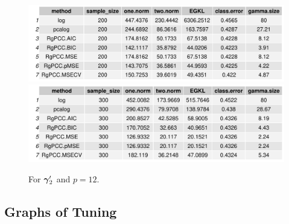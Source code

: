 \documentclass[main.tex]{subfiles}
\begin{document}
\begin{figure}[H]
	\centering
	\includegraphics[width =  \textwidth]{simulated/(sparsity1-100,80)_metrics.pdf}
	\includegraphics[width =  \textwidth]{simulated/(sparsity1-200,80)_metrics.pdf}
	\caption{For $\boldsymbol \gamma_2'$ and $p = 12$.}
	\label{fig:simulated1-80}
\end{figure}

\subsection{Graphs of Tuning}
\end{document}
